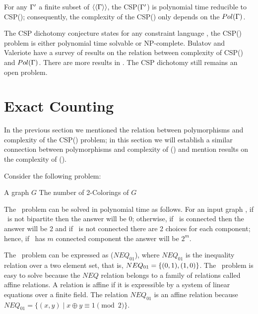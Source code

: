 \begin{cor}
For any \(\Gamma'\) a finite subset of \(\langle\langle \Gamma \rangle\rangle\),
the CSP(\(\Gamma'\)) is polynomial time reducible to  CSP(\mrelset);
consequently, the complexity of the CSP(\mrelset) only depends on the \(Pol(\Gamma)\)\@.
\end{cor}

The CSP dichotomy conjecture states for any constraint language \mrelset, 
the CSP(\mrelset) problem is either polynomial time solvable or NP-complete.
Bulatov and Valeriote \cite{recent08}
have a survey of results on the relation between complexity of CSP(\mrelset) and \(Pol(\Gamma)\).
There are more results in \cite{dur628, valeriote}\@.
The CSP dichotomy still remains an open problem. 

\section{Exact Counting}
In the previous section we mentioned the relation between polymorphisms and complexity of
the CSP(\mrelset) problem; in this section we will establish a similar connection 
between polymorphisms and complexity of \ccsp(\mrelset) and mention 
results on the complexity of \ccsp(\mrelset)\@.

Consider the following problem:

\pdef{\cdcol}
{A graph \(G\)}
{The number of 2-Colorings of \(G\)}

The \cdcol\ problem can be solved in polynomial time as follows.
For an input graph \mG, if \mG\ is not bipartite then the answer will be \(0\); otherwise,
if \mG\ is connected then the answer will be 2 and if \mG\ is not connected
there are 2 choices for each component; hence, if \mG\ has \(m\)
connected component the answer will be \(2^m\)\@.

The \cdcol\ problem can be expressed as \ccsp(\(NEQ_{01}\)), where
\(NEQ_{01}\) is the inequality relation over a two element set, that is,
\(NEQ_{01}=\{{(0,1),(1,0)}\}\)\@. 
The \cdcol\ problem is easy to solve because
the \(NEQ\) relation belongs to a family of relations called affine relations.
A relation is affine if it is expressible by a system of linear equations over a
finite field. The relation \(NEQ_{01}\) is an 
affine relation because \(NEQ_{01} = \{(x,y)\mid x\oplus y \equiv 1 \pmod{2}\}\)\@.

